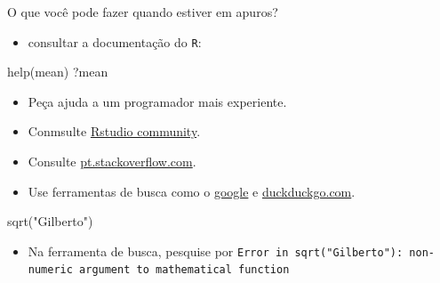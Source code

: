 \documentclass[
  10pt,
  ignorenonframetext,
]{beamer}
\newenvironment{Shaded}{\begin{snugshade}}{\end{snugshade}}
\newcommand{\FunctionTok}[1]{\textcolor[rgb]{0.28,0.35,0.67}{#1}}
\newcommand{\NormalTok}[1]{\textcolor[rgb]{0.00,0.23,0.31}{#1}}
\newcommand{\StringTok}[1]{\textcolor[rgb]{0.13,0.47,0.30}{#1}}
\providecommand{\tightlist}{%
  \setlength{\itemsep}{0pt}\setlength{\parskip}{0pt}}\usepackage{longtable,booktabs,array}
\begin{document}
\begin{frame}[fragile]{O que você pode fazer quando estiver em apuros?}
\protect\hypertarget{o-que-vocuxea-pode-fazer-quando-estiver-em-apuros}{}
\begin{itemize}
\tightlist
\item
  consultar a documentação do \texttt{R}:
\end{itemize}

\begin{Shaded}
\begin{Highlighting}[]
\FunctionTok{help}\NormalTok{(mean)}
\NormalTok{?mean}
\end{Highlighting}
\end{Shaded}

\begin{itemize}
\tightlist
\item
  Peça ajuda a um programador mais experiente.
\item
  Conmsulte \href{https://community.rstudio.com/}{Rstudio community}.
\item
  Consulte \href{https://pt.stackoverflow.com/}{pt.stackoverflow.com}.
\item
  Use ferramentas de busca como o
  \href{https://www.google.com.br/}{google} e
  \href{https://duckduckgo.com/}{duckduckgo.com}.
\end{itemize}

\begin{Shaded}
\begin{Highlighting}[]
\FunctionTok{sqrt}\NormalTok{(}\StringTok{"Gilberto"}\NormalTok{)}
\end{Highlighting}
\end{Shaded}

\begin{itemize}
\tightlist
\item
  Na ferramenta de busca, pesquise por
  \texttt{Error\ in\ sqrt("Gilberto"):\ non-numeric\ argument\ to\ mathematical\ function}
\end{itemize}
\end{frame}
\end{document}
